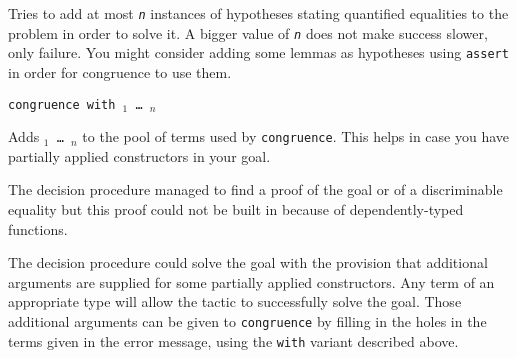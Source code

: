 \begin{coq_example*}
\begin{Variants}
  Tries to add at most {\tt \sl n} instances of hypotheses stating quantified equalities to the problem in order to solve it. A bigger value of {\tt \sl n} does not make success slower, only failure. You might consider adding some lemmas as hypotheses using {\tt assert} in order for congruence to use them.

\item {\tt congruence with \term$_1$ \dots\ \term$_n$}

  Adds {\tt \term$_1$ \dots\ \term$_n$} to the pool of terms used by
  {\tt congruence}. This helps in case you have partially applied
  constructors in your goal.
\end{Variants}

\begin{ErrMsgs}
  \item {}

    The decision procedure managed to find a proof of the goal or of
    a discriminable equality but this proof could not be built in {\Coq}
    because of dependently-typed functions.

  \item {}

    The decision procedure could solve the goal with the provision
    that additional arguments are supplied for some partially applied
    constructors. Any term of an appropriate type will allow the
    tactic to successfully solve the goal. Those additional arguments
    can be given to {\tt congruence} by filling in the holes in the
    terms given in the error message, using the {\tt with} variant
    described above.
\end{ErrMsgs}






































\end{coq_example*}
